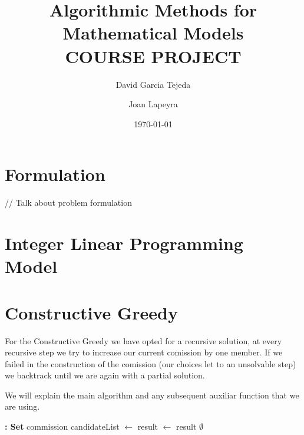 \documentclass{article}
\title{%
  Algorithmic Methods for Mathematical Models\\
  \large COURSE PROJECT }
\author{David Garcia Tejeda \and Joan Lapeyra}
\date{\today}
\begin{document}
\maketitle

\section{Formulation}
// Talk about problem formulation

\section{Integer Linear Programming Model}

\newpage
\section{Constructive Greedy}

For the Constructive Greedy we have opted for a recursive solution, at every recursive step we try to increase our current comission by one member. If we failed in the construction of the comission (our choices let to an unsolvable step) we backtrack until we are again with a partial solution.

We will explain the main algorithm and any subsequent auxiliar function that we are using.

\begin{algorithm}[H]
\begin{algorithmic}[1]
 \textbf{: Set}
        \State \Return commission
    \EndIf
    \State candidateList $\gets$ 
        \State result $\gets$ 
            \State \Return result
        \EndIf
    \EndFor
    \State \Return $\emptyset$
\EndFunction
\end{algorithmic}
\end{algorithm}
\end{document}
